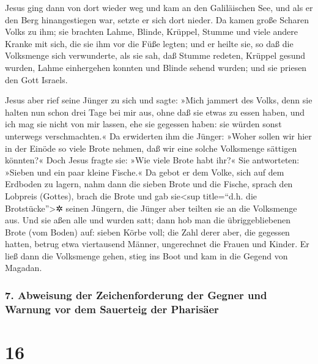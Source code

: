  Jesus ging dann von dort wieder weg und kam an den
Galiläischen See, und als er den Berg hinangestiegen war, setzte er sich
dort nieder.  Da kamen große Scharen Volks zu ihm; sie
brachten Lahme, Blinde, Krüppel, Stumme und viele andere Kranke mit
sich, die sie ihm vor die Füße legten; und er heilte sie,
 so daß die Volksmenge sich verwunderte, als sie sah, daß
Stumme redeten, Krüppel gesund wurden, Lahme einhergehen konnten und
Blinde sehend wurden; und sie priesen den Gott Israels.

 Jesus aber rief seine Jünger zu sich und sagte: »Mich
jammert des Volks, denn sie halten nun schon drei Tage bei mir aus, ohne
daß sie etwas zu essen haben, und ich mag sie nicht von mir lassen, ehe
sie gegessen haben: sie würden sonst unterwegs verschmachten.«
 Da erwiderten ihm die Jünger: »Woher sollen wir hier in
der Einöde so viele Brote nehmen, daß wir eine solche Volksmenge
sättigen könnten?«  Doch Jesus fragte sie: »Wie viele
Brote habt ihr?« Sie antworteten: »Sieben und ein paar kleine Fische.«
 Da gebot er dem Volke, sich auf dem Erdboden zu lagern,
 nahm dann die sieben Brote und die Fische, sprach den
Lobpreis (Gottes), brach die Brote und gab sie\textless sup title=``d.h.
die Brotstücke''\textgreater✲ seinen Jüngern, die Jünger aber teilten
sie an die Volksmenge aus.  Und sie aßen alle und wurden
satt; dann hob man die übriggebliebenen Brote (vom Boden) auf: sieben
Körbe voll;  die Zahl derer aber, die gegessen hatten,
betrug etwa viertausend Männer, ungerechnet die Frauen und Kinder.
 Er ließ dann die Volksmenge gehen, stieg ins Boot und
kam in die Gegend von Magadan.

\hypertarget{abweisung-der-zeichenforderung-der-gegner-und-warnung-vor-dem-sauerteig-der-pharisuxe4er}{%
\subsubsection{7. Abweisung der Zeichenforderung der Gegner und Warnung
vor dem Sauerteig der
Pharisäer}\label{abweisung-der-zeichenforderung-der-gegner-und-warnung-vor-dem-sauerteig-der-pharisuxe4er}}

\hypertarget{section-15}{%
\section{16}\label{section-15}}


